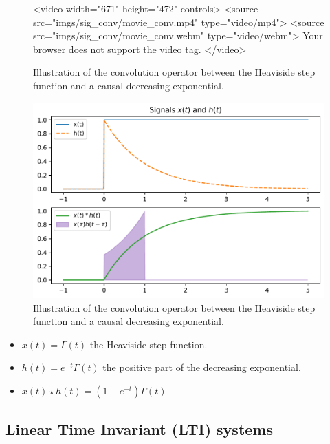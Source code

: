 \begin{warpHTML}
  \begin{figure}[ht]
    \centering
    <video width="671" height="472" controls>
    <source src="imgs/sig\_conv/movie\_conv.mp4" type="video/mp4">
    <source src="imgs/sig\_conv/movie\_conv.webm" type="video/webm">
    Your browser does not support the video tag.
    </video>   
    \caption{Illustration of the convolution operator between the Heaviside step function and a causal decreasing exponential.}
    \label{fig:convolution}
  \end{figure}
\end{warpHTML}
\begin{warpprint}
  \begin{figure}[ht]
    \centering
    \includegraphics[width=.7\linewidth]{imgs/sig_conv/signals_conv}
    \caption{Illustration of the convolution operator between the Heaviside step function and a causal decreasing exponential.}
    \label{fig:convolution}
  \end{figure}
\end{warpprint}



\begin{itemize}
\item $x(t)=\Gamma(t)$ the Heaviside step function.
\item $h(t)=e^{-t}\Gamma(t)$ the positive part of the decreasing exponential.
\item $x(t)\star h(t)=(1-e^{-t})\Gamma(t)$
\end{itemize}

\subsection{Linear Time Invariant (LTI) systems}
\label{sec:lti_systems}



